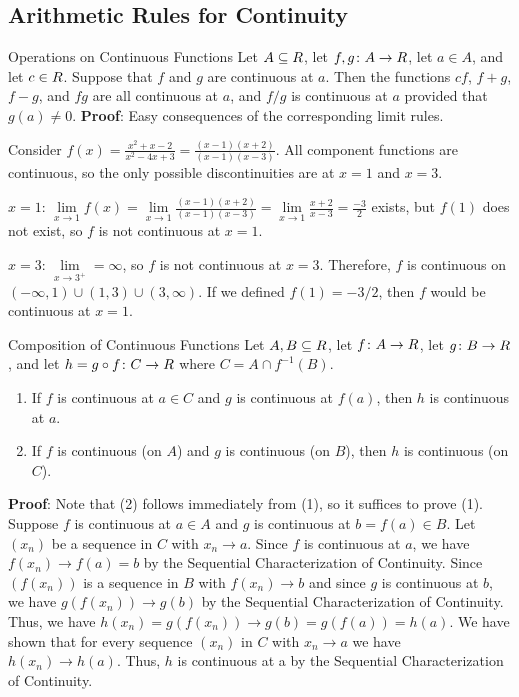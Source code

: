 \subsection{Arithmetic Rules for Continuity}
\begin{Theorem}{Operations on Continuous Functions}{}
    Let $ A\subseteq\relax{R} $, let $ f,g\colon A\to\relax{R} $, let $ a\in A $, and let $ c\in\relax{R} $. Suppose that $ f $
    and $ g $ are continuous at $ a $. Then the functions $ cf $, $ f+g $, $ f-g $, and $ fg $ are all continuous at $ a $,
    and $ f/g $ is continuous at $ a $ provided that $ g(a)\ne 0 $.
    \tcblower{}
    \textbf{Proof}: Easy consequences of the corresponding limit rules.
\end{Theorem}
\begin{Example}{}{}
    Consider $ f(x)=\frac{x^2+x-2}{x^2-4x+3}=\frac{(x-1)(x+2)}{(x-1)(x-3)} $. All component functions are continuous,
    so the only possible discontinuities are at $ x=1 $ and $ x=3 $.

    $ x=1 $: $ \lim\limits_{{x} \to {1}}f(x)=\lim\limits_{{x} \to {1}}\frac{(x-1)(x+2)}{(x-1)(x-3)}=\lim\limits_{{x} \to {1}}\frac{x+2}{x-3}=\frac{-3}{2} $ exists,
    but $ f(1) $ does not exist, so $ f $ is not continuous at $ x=1 $.

    $ x=3 $: $ \lim\limits_{{x} \to {3^+}}=\infty $, so $ f $ is not continuous at $ x=3 $. Therefore,
    $ f $ is continuous on $ (-\infty,1)\cup(1,3)\cup(3,\infty) $. If we defined $ f(1)=-3/2 $, then $ f $
    would be continuous at $ x=1 $.
\end{Example}
\begin{Theorem}{Composition of Continuous Functions}{}
    Let $ A,B\subseteq\relax{R} $, let $ f\colon A\to\relax{R} $, let $ g\colon B\to\relax{R} $, and let $ h=g\circ f\colon C\to \relax{R} $ where $ C=A\cap f^{-1}(B) $.
    \begin{enumerate}[(1)]
        \item If $ f $ is continuous at $ a\in C $ and $ g $ is continuous at $ f(a) $, then $ h $ is continuous at $ a $.
        \item If $ f $ is continuous (on $ A $) and $ g $ is continuous (on $ B $), then $ h $ is continuous (on $ C $).
    \end{enumerate}
    \tcblower{}
    \textbf{Proof}: Note that (2) follows immediately from (1), so it suffices to prove (1). Suppose $ f $
    is continuous at $ a\in A $ and $ g $ is continuous at $ b=f(a)\in B $. Let $ (x_n) $ be a sequence in $ C $
    with $ x_n\to a $. Since $ f $ is continuous at $ a $, we have $ f(x_n)\to f(a)=b $ by the Sequential Characterization of Continuity.
    Since $ (f(x_n)) $ is a sequence in $ B $ with $ f(x_n)\to b $ and since $ g $ is continuous at $ b $,
    we have $ g(f(x_n))\to g(b) $ by the Sequential
    Characterization of Continuity. Thus, we have $ h(x_n)=g(f(x_n))\to g(b)=g(f(a))=h(a) $.
    We have shown that for every sequence $ (x_n) $ in $ C $ with $ x_n\to a $ we have $ h(x_n)\to h(a) $.
    Thus, $h$ is continuous at a by the Sequential Characterization of Continuity.
\end{Theorem}
